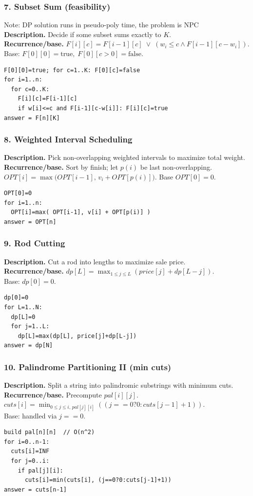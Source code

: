\documentclass[9pt]{extarticle}
\begin{document}
\subsubsection{7. Subset Sum (feasibility)}
Note: DP solution runs in pseudo-poly time, the problem is NPC\\
\textbf{Description.} Decide if some subset sums exactly to \(K\).\\
\textbf{Recurrence/base.} \(F[i][c]=F[i-1][c]\;\lor\;(w_i\le c \land F[i-1][c-w_i])\).  \\
Base: \(F[0][0]=\text{true},\;F[0][c>0]=\text{false}\).
\begin{verbatim}
F[0][0]=true; for c=1..K: F[0][c]=false
for i=1..n:
  for c=0..K:
    F[i][c]=F[i-1][c]
    if w[i]<=c and F[i-1][c-w[i]]: F[i][c]=true
answer = F[n][K]
\end{verbatim}

\subsubsection{8. Weighted Interval Scheduling}
\textbf{Description.} Pick non-overlapping weighted intervals to maximize total weight.\\
\textbf{Recurrence/base.} Sort by finish; let \(p(i)\) be last non-overlapping.  \\
\(OPT[i]=\max\big(OPT[i-1],\,v_i+OPT[p(i)]\big)\). Base \(OPT[0]=0\).\\
\begin{verbatim}
OPT[0]=0
for i=1..n:
  OPT[i]=max( OPT[i-1], v[i] + OPT[p(i)] )
answer = OPT[n]
\end{verbatim}

\subsubsection{9. Rod Cutting}
\textbf{Description.} Cut a rod into lengths to maximize sale price.\\
\textbf{Recurrence/base.} \(dp[L]=\max_{1\le j\le L}(price[j]+dp[L-j])\).\\  
Base: \(dp[0]=0\).
\begin{verbatim}
dp[0]=0
for L=1..N:
  dp[L]=0
  for j=1..L:
    dp[L]=max(dp[L], price[j]+dp[L-j])
answer = dp[N]
\end{verbatim}

\subsubsection{10. Palindrome Partitioning II (min cuts)}
\textbf{Description.} Split a string into palindromic substrings with minimum cuts.\\
\textbf{Recurrence/base.} Precompute \(pal[i][j]\).  \\
\(cuts[i]=\min_{0\le j\le i,\,pal[j][i]}( (j==0?0:cuts[j-1]+1) )\).  \\
Base: handled via \(j==0\).
\begin{verbatim}
build pal[n][n]  // O(n^2)
for i=0..n-1:
  cuts[i]=INF
  for j=0..i:
    if pal[j][i]:
      cuts[i]=min(cuts[i], (j==0?0:cuts[j-1]+1))
answer = cuts[n-1]
\end{verbatim}
\end{document}
